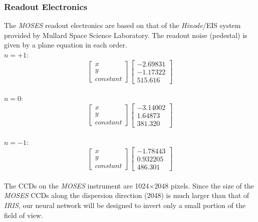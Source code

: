 \documentclass[10pt,a4paper,titlepage]{article}
\begin{document}
		\subsubsection{Readout Electronics}
			The \textit{MOSES} readout electronics are based on that of the \textit{Hinode}/EIS system provided by Mullard Space Science Laboratory. The readout noise (pedestal) is given by a plane equation in each order.\\
			
			$n = +1:$
			\begin{equation}	
				\begin{bmatrix} x\\ y\\ constant \end{bmatrix}
				\begin{bmatrix} -2.69831\\ -1.17322\\ 515.616 \end{bmatrix}
			\end{equation}\\
			
			$n = 0:$
			\begin{equation}
			\begin{bmatrix}  x\\ y\\ constant \end{bmatrix}
			\begin{bmatrix} -3.14002\\ 1.64873\\ 381.320 \end{bmatrix}
			\end{equation}\\
			
			$n = -1:$
			\begin{equation}
			\begin{bmatrix}  x\\ y\\ constant \end{bmatrix}
			\begin{bmatrix} -1.78443\\ 0.932205\\ 486.301 \end{bmatrix}
			\end{equation}\\
			
			The CCDs on the \textit{MOSES} instrument are 1024$\times$2048 pixels. Since the size of the \textit{MOSES} CCDs along the dispersion direction (2048) is much larger than that of \textit{IRIS}, our neural network will be designed to invert only a small portion of the field of view.
\end{document}
